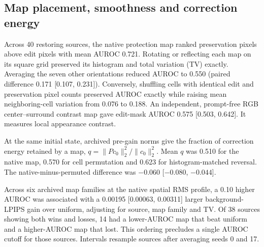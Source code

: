 \subsection{Map placement, smoothness and correction energy}
\label{sec:v21-map}
Across 40 restoring sources, the native protection map ranked preservation pixels above edit pixels with mean AUROC 0.721. Rotating or reflecting each map on its square grid preserved its histogram and total variation (TV) exactly. Averaging the seven other orientations reduced AUROC to 0.550 (paired difference 0.171 [0.107, 0.231]). Conversely, shuffling cells with identical edit and preservation pixel counts preserved AUROC exactly while raising mean neighboring-cell variation from 0.076 to 0.188. An independent, prompt-free RGB center--surround contrast map gave edit-mask AUROC 0.575 [0.503, 0.642]. It measures local appearance contrast.

At the same initial state, archived pre-gain norms give the fraction of correction energy retained by a map, $q=\lVert P c_0\rVert_2^2/\lVert c_0\rVert_2^2$. Mean $q$ was 0.510 for the native map, 0.570 for cell permutation and 0.623 for histogram-matched reversal. The native-minus-permuted difference was $-0.060$ [$-0.080$, $-0.044$].

Across six archived map families at the native spatial RMS profile, a 0.10 higher AUROC was associated with a 0.00195 [0.00063, 0.00311] larger background-LPIPS gain over uniform, adjusting for source, map family and TV. Of 38 sources showing both wins and losses, 14 had a lower-AUROC map that beat uniform and a higher-AUROC map that lost. This ordering precludes a single AUROC cutoff for those sources. Intervals resample sources after averaging seeds 0 and 17.
